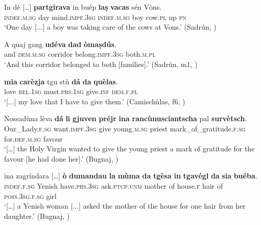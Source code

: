 \ea\label{ex:trans2}
\gll    In dé […] \textbf{partgirava} in buép {\ob}\textbf{laṣ} \textbf{vacas}{\cb} sén Vòns.\\
     \textsc{indef.m.sg} day {} mind.\textsc{impf.3sg} \textsc{indef.m.sg} boy \textsc{} cow.\textsc{pl} up \textsc{pn}\\
\glt `One day [...] a boy was taking care of the cows at Vons.' (Sadrún, \citealt[103]{Büchli1966})
\z

\ea
\label{ex:trans:indir}
\gll    A quaj gang \textbf{udéva} {\ob}\textbf{dad} \textbf{òmaṣdús}{\cb}.\\
and \textsc{dem.m.sg} corridor belong.\textsc{impf.3sg} \textsc{} both.\textsc{m.pl}\\
\glt `And this corridor belonged to both [families].' (Sadrún, m1, )
\z

\ea
\label{ex:ditrans1}
\gll    [...] {\ob}\textbf{mia} \textbf{carèzja}{\cb} tgu stù \textbf{dá} {\ob}\textbf{da} \textbf{quèlas}{\cb}.\\
{} \textsc{} love \textsc{rel.1sg} must.\textsc{prs.1sg} give.\textsc{inf} \textsc{} \textsc{dem.f.pl}\\
\glt `[...] my love that I have to give them.' (Camischùlas, f6, )
\z

\ea\label{ex:ditrans2}
\gll    […] Nossadùna lèva \textbf{dá} {\ob}\textbf{li} \textbf{gjuven} \textbf{préjr}{\cb} {\ob}\textbf{ina} \textbf{rancùnusciantscha} pal \textbf{survètsch}{\cb}.\\
   {}  Our\_Lady.\textsc{f.sg} want.\textsc{impf.3sg} give \textsc{} young.\textsc{m.sg} priest \textsc{} mark\_of\_gratitude.\textsc{f.sg} for.\textsc{def.m.sg} favour \\
\glt `[…] the Holy Virgin wanted to give the young priest a mark of gratitude for the favour [he had done her].' (Bugnaj, \citealt[145]{Büchli1966})
\z

\ea
\label{ex:trans:2DO}
\gll  [...]  ina zagríndara […] \textbf{ò} \textbf{dumandau} {\ob}\textbf{la} \textbf{mùma} \textbf{da} \textbf{tgèsa}{\cb} {\ob}\textbf{in} \textbf{tgavégl} \textbf{da} \textbf{sia} \textbf{buéba}{\cb}. \\
{} \textsc{indef.f.sg} Yenish {} have.\textsc{prs.3sg}   ask.\textsc{ptcp.unm} \textsc{} mother of house.\textsc{f}  hair of \textsc{poss.3sg.f.sg} girl \\
\glt `[…] a Yenish woman [...] asked the mother of the house for one hair from her daughter.' (Bugnaj, \citealt[131]{Büchli1966})
\z


